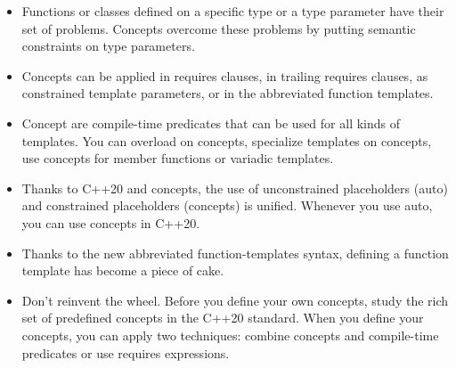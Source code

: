 \begin{tcolorbox}[breakable,enhanced jigsaw,colback=mygreen!5!white,colframe=mygreen!75!black,title=Distilled Information]
\begin{itemize}
\item 
Functions or classes defined on a specific type or a type parameter have their set of problems. Concepts overcome these problems by putting semantic constraints on type parameters.

\item 
Concepts can be applied in requires clauses, in trailing requires clauses, as constrained template parameters, or in the abbreviated function templates.

\item 
Concept are compile-time predicates that can be used for all kinds of templates. You can overload on concepts, specialize templates on concepts, use concepts for member functions or variadic templates.

\item 
Thanks to C++20 and concepts, the use of unconstrained placeholders (auto) and constrained placeholders (concepts) is unified. Whenever you use auto, you can use concepts in C++20.

\item 
Thanks to the new abbreviated function-templates syntax, defining a function template has become a piece of cake.

\item 
Don’t reinvent the wheel. Before you define your own concepts, study the rich set of predefined concepts in the C++20 standard. When you define your concepts, you can apply two techniques: combine concepts and compile-time predicates or use requires expressions.
\end{itemize}
\end{tcolorbox}



















